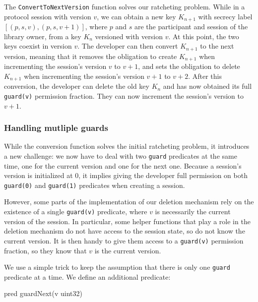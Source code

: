 The \texttt{ConvertToNextVersion} function solves our ratcheting problem. While in a protocol session with version $v$, we can obtain a new key $K_{n+1}$ with secrecy label $[(p,s,v), (p,s,v+1)]$, where $p$ and $s$ are the participant and session of the library owner, from a key $K_n$ versioned with version $v$. At this point, the two keys coexist in version $v$. The developer can then convert $K_{n+1}$ to the next version, meaning that it removes the obligation to create $K_{n+1}$ when incrementing the session's version $v$ to $v+1$, and sets the obligation to delete $K_{n+1}$ when incrementing the session's version $v+1$ to $v+2$. After this conversion, the developer can delete the old key $K_n$ and has now obtained its full \texttt{guard(v)} permission fraction. They can now increment the session's version to $v+1$.

\subsubsection{Handling mutliple guards}

While the conversion function solves the initial ratcheting problem, it introduces a new challenge: we now have to deal with two \texttt{guard} predicates at the same time, one for the current version and one for the next one.
Because a session's version is initialized at $0$, it implies giving the developer full permission on both \texttt{guard(0)} and \texttt{guard(1)} predicates when creating a session.

However, some parts of the implementation of our deletion mechanism rely on the existence of a single \texttt{guard(v)} predicate, where $v$ is necessarily the current version of the session.
In particular, some helper functions that play a role in the deletion mechanism do not have access to the session state, so do not know the current version.
It is then handy to give them access to a \texttt{guard(v)} permission fraction, so they know that $v$ is the current version.

We use a simple trick to keep the assumption that there is only one \texttt{guard} predicate at a time. We define an additional predicate:
\begin{gobra}
pred guardNext(v uint32)
\end{gobra}

